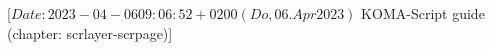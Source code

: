 %
%
%
%
%
%
%

%
                 [$Date: 2023-04-06 09:06:52 +0200 (Do, 06. Apr 2023) $
                  KOMA-Script guide (chapter: scrlayer-scrpage)]

